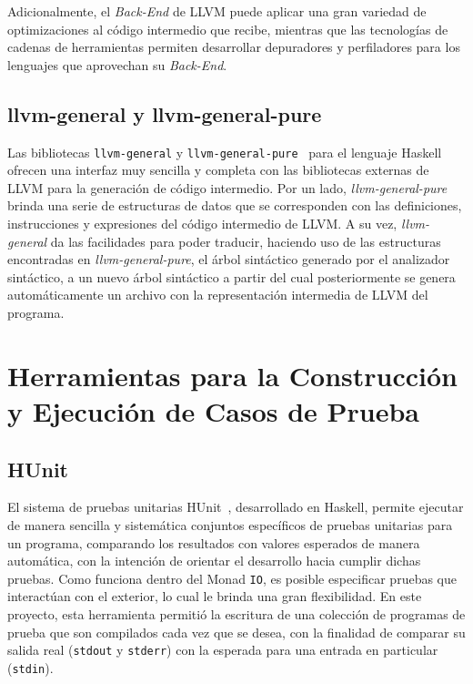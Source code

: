 Adicionalmente, el \textit{Back-End} de LLVM puede aplicar una gran variedad de
optimizaciones al código intermedio que recibe, mientras que las tecnologías de
cadenas de herramientas permiten desarrollar depuradores y perfiladores para los
lenguajes que aprovechan su \textit{Back-End}.

\subsection{llvm-general y llvm-general-pure}

Las bibliotecas \texttt{llvm-general} y
\texttt{llvm-general-pure}~\cite{llvm-general, llvm-general-pure} para el
lenguaje Haskell ofrecen una interfaz muy sencilla y completa con las
bibliotecas externas de LLVM para la generación de código intermedio. Por un
lado, \textit{llvm-general-pure} brinda una serie de estructuras de datos que se
corresponden con las definiciones, instrucciones y expresiones del código
intermedio de LLVM. A su vez, \textit{llvm-general} da las facilidades para
poder traducir, haciendo uso de las estructuras encontradas en
\textit{llvm-general-pure}, el árbol sintáctico generado por el analizador
sintáctico, a un nuevo árbol sintáctico a partir del cual posteriormente se
genera automáticamente un archivo con la representación intermedia de LLVM del
programa.

\section{Herramientas para la Construcción y Ejecución de Casos de Prueba}

\subsection{HUnit}

El sistema de pruebas unitarias HUnit~\cite{hunit}, desarrollado en Haskell, 
permite ejecutar de manera sencilla y sistemática conjuntos específicos de 
pruebas unitarias para un programa, comparando los resultados con valores 
esperados de manera automática, con la intención de orientar el desarrollo 
hacia cumplir dichas pruebas. Como funciona dentro del Monad \texttt{IO}, es 
posible especificar pruebas que interactúan con el exterior, lo cual le brinda 
una gran flexibilidad. En este proyecto, esta herramienta permitió la escritura 
de una colección de programas de prueba que son compilados cada vez que se 
desea, con la finalidad de comparar su salida real (\texttt{stdout} y 
\texttt{stderr}) con la esperada para una entrada en particular 
(\texttt{stdin}).

